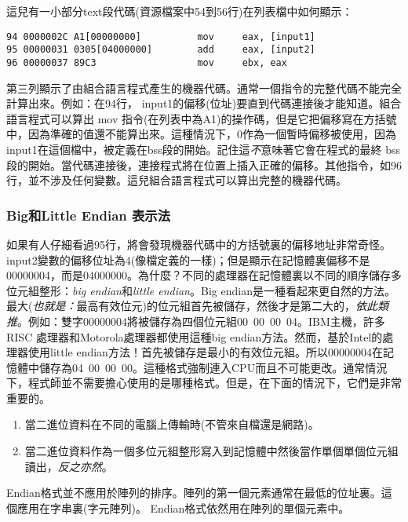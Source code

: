 這兒有一小部分text段代碼(資源檔案中54到56行)在列表檔中如何顯示：
\begin{Verbatim}[xleftmargin=\AsmMargin]
94 0000002C A1[00000000]          mov     eax, [input1]
95 00000031 0305[04000000]        add     eax, [input2]
96 00000037 89C3                  mov     ebx, eax
\end{Verbatim}
第三列顯示了由組合語言程式產生的機器代碼。通常一個指令的完整代碼不能完全計算出來。例如：在94行，{\code
input1}的偏移(位址)要直到代碼連接後才能知道。組合語言程式可以算出{\code
mov}
指令(在列表中為A1)的操作碼，但是它把偏移寫在方括號中，因為準確的值還不能算出來。這種情況下，0作為一個暫時偏移被使用，因為{\code
input1}在這個檔中，被定義在bss段的開始。記住這\emph{不}意味著它會在程式的最終
bss
段的開始。當代碼連接後，連接程式將在位置上插入正確的偏移。其他指令，如96行，並不涉及任何變數。這兒組合語言程式可以算出完整的機器代碼。

\subsubsection{Big和Little Endian 表示法 }
如果有人仔細看過95行，將會發現機器代碼中的方括號裏的偏移地址非常奇怪。{\code
input2}變數的偏移位址為4(像檔定義的一樣)；但是顯示在記憶體裏偏移不是00000004，而是04000000。為什麼？不同的處理器在記憶體裏以不同的順序儲存多位元組整形：\emph{big
endian}和\emph{little endian}。Big endian是一種看起來更自然的方法。最大(\emph{也就是：}最高有效位元)的位元組首先被儲存，然後才是第二大的，\emph{依此類推}。例如：雙字00000004將被儲存為四個位元組00~00~00~04。IBM主機，許多RISC 處理器和Motorola處理器都使用這種big endian方法。然而，基於Intel的處理器使用little endian方法！首先被儲存是最小的有效位元組。所以00000004在記憶體中儲存為04~00~00~00。這種格式強制連入CPU而且不可能更改。通常情況下，程式師並不需要擔心使用的是哪種格式。但是，在下面的情況下，它們是非常重要的。

\begin{enumerate}
\item 當二進位資料在不同的電腦上傳輸時(不管來自檔還是網路)。
\item 當二進位資料作為一個多位元組整形寫入到記憶體中然後當作單個單個位元組讀出，\emph{反之亦然}。
\end{enumerate}

Endian格式並不應用於陣列的排序。陣列的第一個元素通常在最低的位址裏。這個應用在字串裏(字元陣列)。
Endian格式依然用在陣列的單個元素中。 

